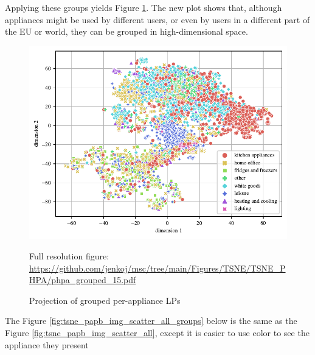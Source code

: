 Applying these groups yields Figure \ref{fig:tsne_papb_scatter_all_groups}.
The new plot shows that, although appliances might be used by different
users, or even by users in a different part of the EU or world,
they can be grouped in high-dimensional space.

\begin{figure}[H]
	\centering
	\caption{Projection of grouped per-appliance LPs}
	\includegraphics[]{Figures/TSNE/TSNE_PHPA/phpa_grouped_15.pdf}
	\label{fig:tsne_papb_scatter_all_groups}
	\par
	\par\footnotesize{Full resolution figure: \url{https://github.com/jenkoj/msc/tree/main/Figures/TSNE/TSNE_PHPA/phpa_grouped_15.pdf}}
\end{figure} 

The Figure \ref{fig:tsne_papb_img_scatter_all_groups} below is the same as the Figure \ref{fig:tsne_papb_img_scatter_all},
except it is easier to use color to see the appliance they present

